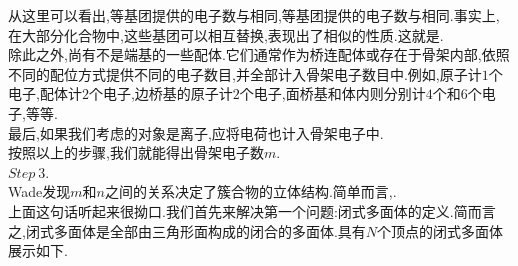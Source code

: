 \documentclass{ctexart}
\begin{document}
从这里可以看出,等基团提供的电子数与相同,等基团提供的电子数与相同.事实上,在大部分化合物中,这些基团可以相互替换,表现出了相似的性质.这就是.\\
\indent 除此之外,尚有不是端基的一些配体.它们通常作为桥连配体或存在于骨架内部,依照不同的配位方式提供不同的电子数目,并全部计入骨架电子数目中.例如,原子计$1$个电子,配体计$2$个电子,边桥基的原子计$2$个电子,面桥基和体内则分别计$4$个和$6$个电子,等等.\\
\indent 最后,如果我们考虑的对象是离子,应将电荷也计入骨架电子中.\\
\indent 按照以上的步骤,我们就能得出骨架电子数$m$.\\
\indent $\mathit{Step\ 3.}$\ \\
\indent Wade发现$m$和$n$之间的关系决定了簇合物的立体结构.简单而言,.\\
\indent 上面这句话听起来很拗口.我们首先来解决第一个问题:闭式多面体的定义.简而言之,闭式多面体是全部由三角形面构成的闭合的多面体.具有$N$个顶点的闭式多面体展示如下.
\end{document}
